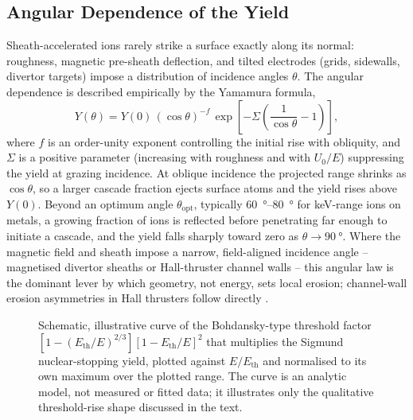 \subsection{Angular Dependence of the Yield}

Sheath-accelerated ions rarely strike a surface exactly along its normal: roughness, magnetic pre-sheath deflection, and tilted electrodes (grids, sidewalls, divertor targets) impose a distribution of incidence angles $\theta$. The angular dependence is described empirically by the Yamamura formula,
\begin{equation}
Y(\theta) = Y(0)\,(\cos\theta)^{-f}\, \exp\!\left[-\Sigma\!\left(\frac{1}{\cos\theta}-1\right)\right],
\label{eq:pmi-yamamura}
\end{equation}
where $f$ is an order-unity exponent controlling the initial rise with obliquity, and $\Sigma$ is a positive parameter (increasing with roughness and with $U_0/E$) suppressing the yield at grazing incidence. At oblique incidence the projected range shrinks as $\cos\theta$, so a larger cascade fraction ejects surface atoms and the yield rises above $Y(0)$. Beyond an optimum angle $\theta_{\mathrm{opt}}$, typically \SIrange{60}{80}{\degree} for keV-range ions on metals, a growing fraction of ions is reflected before penetrating far enough to initiate a cascade, and the yield falls sharply toward zero as $\theta \to \SI{90}{\degree}$. Where the magnetic field and sheath impose a narrow, field-aligned incidence angle -- magnetised divertor sheaths or Hall-thruster channel walls -- this angular law is the dominant lever by which geometry, not energy, sets local erosion; channel-wall erosion asymmetries in Hall thrusters follow directly \cite{ref0425,ref0433}.

\begin{figure}[htbp]
\centering
{}
\caption{Schematic, illustrative curve of the Bohdansky-type threshold factor $[1-(E_{\mathrm{th}}/E)^{2/3}][1-E_{\mathrm{th}}/E]^{2}$ that multiplies the Sigmund nuclear-stopping yield, plotted against $E/E_{\mathrm{th}}$ and normalised to its own maximum over the plotted range. The curve is an analytic model, not measured or fitted data; it illustrates only the qualitative threshold-rise shape discussed in the text.}
\label{fig:pmi-yield-energy}
\end{figure}

